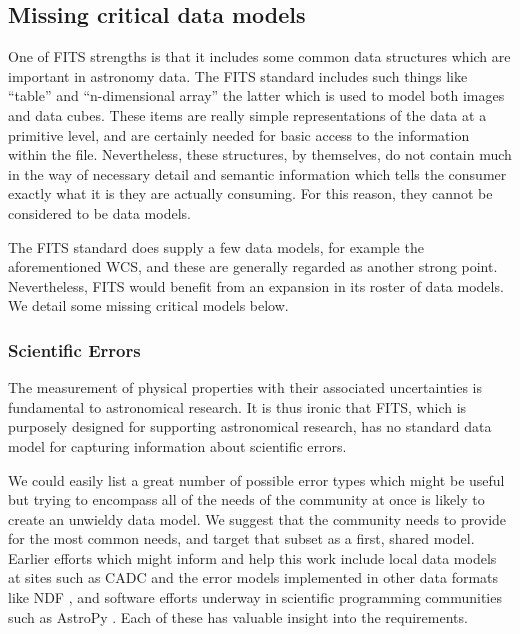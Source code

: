 \documentclass[final,authoryear,5p,times,twocolumn]{elsarticle}
\begin{document}
{{\subsection{Missing critical data models}
\label{section_crit_data_models}


One of FITS strengths is that it includes some common data structures 
which are important in astronomy data. The FITS standard includes such 
things like ``table'' and ``n-dimensional array'' the latter which is 
used to model both images and data cubes.  These items are really simple 
representations of the data at a primitive level, and are certainly 
needed for basic access to the information within the file.  Nevertheless, 
these structures, by themselves, do not contain much in the way of necessary 
detail and semantic information which tells the consumer exactly what 
it is they are actually consuming. For this reason, they cannot be considered to
be data models.


The FITS standard does supply a few data models, for example the aforementioned
WCS, and these are generally regarded as another strong point. 
Nevertheless, FITS would benefit from an expansion in its roster of data models.
We detail some missing critical models below.


\subsubsection{Scientific Errors}


The measurement of physical properties with their associated uncertainties
is fundamental to astronomical
research. It is thus ironic that FITS, which is purposely designed for
supporting astronomical research, has no standard data model for
capturing information about scientific errors.


We could easily list a great number of possible error types which
might be useful but trying to encompass all of the needs of the
community at once is likely to create an unwieldy data model. We
suggest that the community needs to provide for the most common needs,
and target that subset as a first, shared model. Earlier efforts which
might inform and help this work include local data models at sites
such as CADC \citep{2012ASPC..461..339D} and the error
models implemented in other data formats like NDF
\citep[although see for example][]{1991STARB...8...19M}, and software
efforts underway in scientific programming communities such as AstroPy
\citep{2013A&A...558A..33A}. Each of these has valuable insight into
the requirements.


}}
\end{document}
